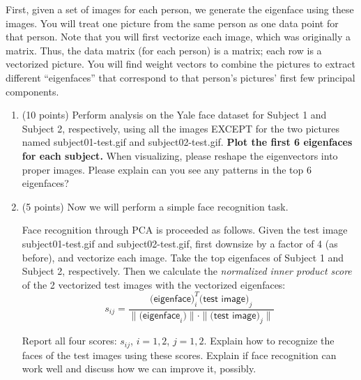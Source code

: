 \documentclass[twoside,12pt]{article}
\begin{document}
First, given a set of images for each person, we generate the eigenface using these images. You will treat one picture from the same person as one data point for that person. Note that you will first vectorize each image, which was originally a matrix. Thus, the data matrix (for each person) is a matrix; each row is a vectorized picture. You will find weight vectors to combine the pictures to extract different ``eigenfaces'' that correspond to that person's pictures' first few principal components. 


\begin{enumerate}

\item (10 points) Perform analysis on the Yale face dataset for Subject 1 and Subject 2, respectively, using all the images EXCEPT for the two pictures named \textsf{subject01-test.gif} and \textsf{subject02-test.gif}. {\bf Plot the first 6 eigenfaces for each subject.} When visualizing, please reshape the eigenvectors into proper images. Please explain can you see any patterns in the top 6 eigenfaces?

\item (5 points) Now we will perform a simple face recognition task. 

Face recognition through PCA is proceeded as follows. Given the test image \textsf{subject01-test.gif} and \textsf{subject02-test.gif}, first downsize by a factor of 4 (as before), and vectorize each image. Take the top eigenfaces of Subject 1 and Subject 2, respectively. Then we calculate the {\it normalized inner product score} of the 2 vectorized test images with the vectorized eigenfaces:
\[s_{ij} =\frac{\textsf{(eigenface})_i^T \textsf{(test image)}_j}{\|\textsf{(eigenface}_i)\| \cdot\|\textsf{(test image)}_j\|}\]

Report all four scores: $s_{ij}$, $i = 1, 2$, $j = 1, 2.$ Explain how to recognize the faces of the test images using these scores. Explain if face recognition can work well and discuss how we can improve it, possibly. 


\end{enumerate}
\end{document}
